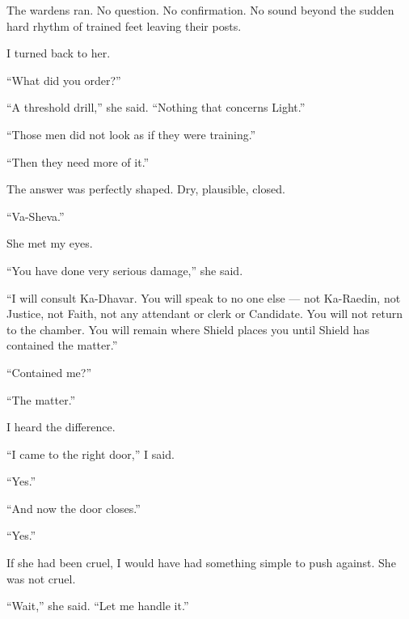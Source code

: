 The wardens ran. No question. No confirmation. No sound beyond the sudden hard rhythm of trained feet leaving their posts.\par

I turned back to her.\par

``What did you order?''\par

``A threshold drill,'' she said. ``Nothing that concerns Light.''\par

``Those men did not look as if they were training.''\par

``Then they need more of it.''\par

The answer was perfectly shaped. Dry, plausible, closed.\par

``Va-Sheva.''\par

She met my eyes.\par

``You have done very serious damage,'' she said.\par

``I will consult Ka-Dhavar. You will speak to no one else --- not Ka-Raedin, not Justice, not Faith, not any attendant or clerk or Candidate. You will not return to the chamber. You will remain where Shield places you until Shield has contained the matter.''\par

``Contained me?''\par

``The matter.''\par

I heard the difference.\par

``I came to the right door,'' I said.\par

``Yes.''\par

``And now the door closes.''\par

``Yes.''\par

If she had been cruel, I would have had something simple to push against. She was not cruel.\par

``Wait,'' she said. ``Let me handle it.''\par

